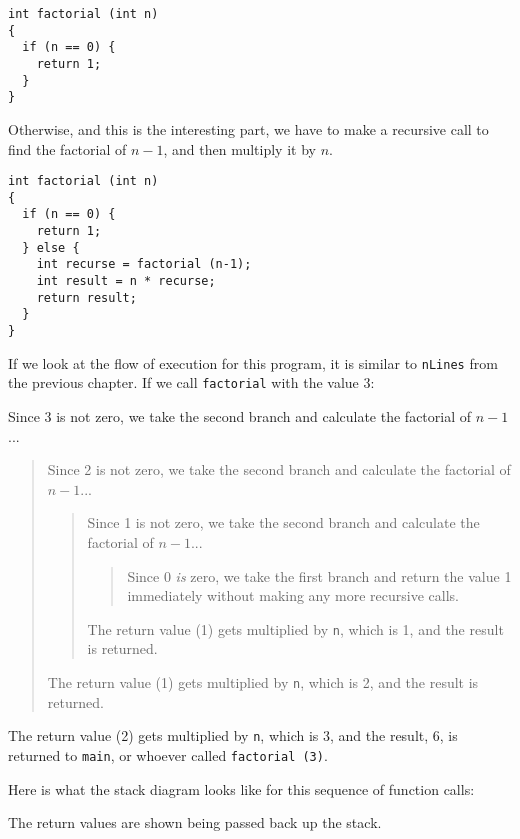 \begin{verbatim}
int factorial (int n)
{
  if (n == 0) {
    return 1;
  }
}
\end{verbatim}
%
Otherwise, and this is the interesting part, we have to make
a recursive call to find the factorial of $n-1$, and then
multiply it by $n$.

\begin{verbatim}
int factorial (int n)
{
  if (n == 0) {
    return 1;
  } else {
    int recurse = factorial (n-1);
    int result = n * recurse;
    return result;
  }
}
\end{verbatim}
%
If we look at the flow of execution for this program,
it is similar to {\tt nLines} from the previous chapter.
If we call {\tt factorial} with the value 3:

Since 3 is not zero, we take the second branch and calculate
the factorial of $n-1$...

\begin{quote}
Since 2 is not zero, we take the second branch and calculate
the factorial of $n-1$...

\begin{quote}
Since 1 is not zero, we take the second branch and calculate
the factorial of $n-1$...

\begin{quote}
Since 0 {\em is} zero, we take the first branch and return
the value 1 immediately without making any more recursive
calls.

\end{quote}

The return value (1) gets multiplied by {\tt n}, which is 1,
and the result is returned.

\end{quote}

The return value (1) gets multiplied by {\tt n}, which is 2,
and the result is returned.

\end{quote}

\noindent The return value (2) gets multiplied by {\tt n}, which is 3,
and the result, 6, is returned to {\tt main}, or whoever
called {\tt factorial (3)}.


Here is what the stack diagram looks like for this sequence of
function calls:

\vspace{0.1in}
\centerline{}
\vspace{0.1in}
%
The return values are shown being passed back up the stack.

